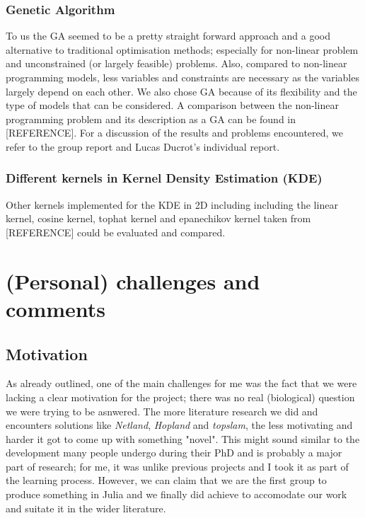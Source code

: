 \documentclass[journal, a4paper]{IEEEtran}
\begin{document}
\subsubsection{Genetic Algorithm}
To us the GA seemed to be a pretty straight forward approach and a good alternative to traditional optimisation methods; especially for non-linear problem and unconstrained (or largely feasible) problems. Also, compared to non-linear programming models, less variables and constraints are necessary as the variables largely depend on each other. We also chose GA because of its flexibility and the type of models that can be considered. A comparison between the non-linear programming problem and its description as a GA can be found in [REFERENCE].%
For a discussion of the results and problems encountered, we refer to the group report and Lucas Ducrot's individual report.


\subsubsection{Different kernels in Kernel Density Estimation (KDE)} 

Other kernels implemented for the KDE in 2D including including the linear kernel, cosine kernel, tophat kernel and epanechikov kernel taken from [REFERENCE] could be evaluated and compared. 


\section{(Personal) challenges and comments}\label{personalchallenges}


\subsection{Motivation}
As already outlined, one of the main challenges for me was the fact that we were lacking a clear motivation for the project; there was no real (biological) question we were trying to be asnwered. The more literature research we did and encounters solutions like \textit{Netland}, \textit{Hopland} and \textit{topslam}, the less motivating and harder it got to come up with something "novel". This might sound similar to the development many people undergo during their PhD and is probably a major part of research; for me, it was unlike previous projects and I took it as part of the learning process.
However, we can claim that we are the first group to produce something in Julia and we finally did achieve to accomodate our work and suitate it in the wider literature. 
\end{document}
